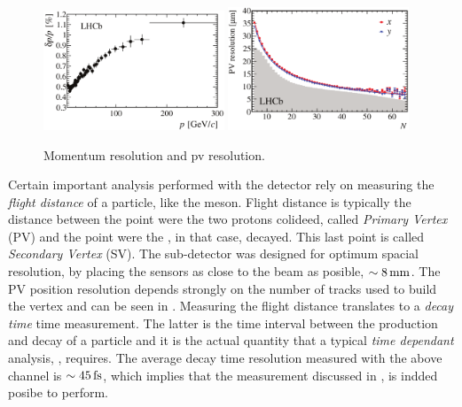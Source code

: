 \begin{figure}[t]
  \centering
  \includegraphics[width=0.48\textwidth]{Figures/Chapter2/dppVsp-crop-cmyk}
  \includegraphics[width=0.48\textwidth]{Figures/Chapter2/DataResXY_1PV_2012-crop-cmyk.pdf}
  \caption{\lhcb Momentum resolution and pv resolution.}
  \label{det_deltappvp}
\end{figure}

Certain important analysis performed with the \lhcb detector rely on measuring the {\it flight distance} of a particle, like the \Bs meson.
Flight distance is typically the distance between the point were the two protons colideed, called {\it Primary Vertex} (PV)
and the point were the \Bs, in that case, decayed. This last point is called {\it Secondary Vertex} (SV). The \velo sub-detector
was designed for optimum spacial resolution, by placing the \velo sensors as close to the beam as posible, $\sim 8 \rm \,mm$.
The PV position resolution depends strongly on the number of tracks used to build the vertex and can be seen in \figref{}.
Measuring the flight distance translates to a {\it decay time} time measurement. The latter is the time interval between
the production and decay of a particle and it is the actual quantity that a typical {\it time dependant} analysis,
\eg \BsJpsiPhi, requires. The average decay time resolution measured with the above channel is $\sim 45\rm \,fs$, which
implies that the \phis measurement discussed in \secref{}, is indded posibe to perform.

